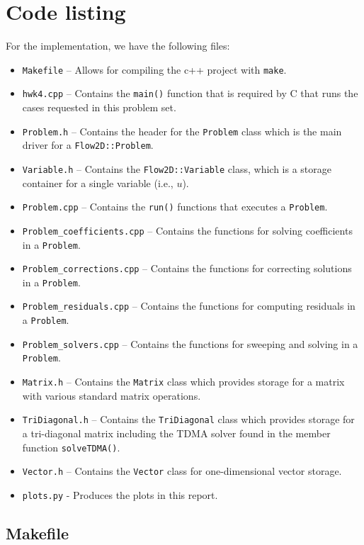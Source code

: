 \documentclass{article}
\begin{document}
\section*{Code listing}

For the implementation, we have the following files:
\begin{itemize}
	\item \texttt{Makefile} -- Allows for compiling the c++ project with \texttt{make}.
	\item \texttt{hwk4.cpp} -- Contains the \texttt{main()} function that is required by C that runs the cases requested in this problem set.
	\item \texttt{Problem.h} -- Contains the header for the \texttt{Problem} class which is the main driver for a \texttt{Flow2D::Problem}.
	\item \texttt{Variable.h} -- Contains the \texttt{Flow2D::Variable} class, which is a storage container for a single variable (i.e., $u$).
	\item \texttt{Problem.cpp} -- Contains the \texttt{run()} functions that executes a \texttt{Problem}.
	\item \texttt{Problem\_coefficients.cpp} -- Contains the functions for solving coefficients in a \texttt{Problem}.
	\item \texttt{Problem\_corrections.cpp} -- Contains the functions for correcting solutions in a \texttt{Problem}.
	\item \texttt{Problem\_residuals.cpp} -- Contains the functions for computing residuals in a \texttt{Problem}.
	\item \texttt{Problem\_solvers.cpp} -- Contains the functions for sweeping and solving in a \texttt{Problem}.
	\item \texttt{Matrix.h} -- Contains the \texttt{Matrix} class which provides storage for a matrix with various standard matrix operations.
	\item \texttt{TriDiagonal.h} -- Contains the \texttt{TriDiagonal} class which provides storage for a tri-diagonal matrix including the TDMA solver found in the member function \texttt{solveTDMA()}.
	\item \texttt{Vector.h} -- Contains the \texttt{Vector} class for one-dimensional vector storage.
	\item \texttt{plots.py} - Produces the plots in this report.
\end{itemize}

\subsection*{Makefile}
\inputminted[fontsize=\scriptsize]{Makefile}{../Makefile}
\end{document}
